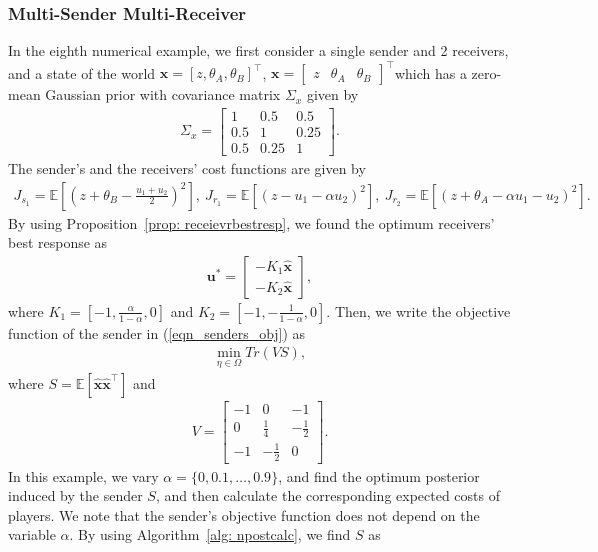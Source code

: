 \documentclass[12pt,journal,onecolumn]{IEEEtran}
\begin{document}
\subsubsection{Multi-Sender Multi-Receiver}
In the eighth numerical example, we first consider a single sender and 2 receivers, and a state of the world $\boldsymbol{x} = [z, \theta_A, \theta_B ]^\top$,  $\boldsymbol{x} = \begin{bmatrix}
    z & \theta_A &\theta_B 
\end{bmatrix}^\top$which has a zero-mean Gaussian prior with covariance matrix $\Sigma_x$ given by 
\begin{align}
    \Sigma_x=\begin{bmatrix}1 &0.5 &0.5\\0.5 &1 &0.25\\ 0.5 &0.25 &1\end{bmatrix}.
\end{align}
The sender's and the receivers' cost functions are given by 
\begin{align}
 J_{s_1} =\mathbb{E}\left[\left(z+ \theta_B-\frac{u_1+u_2}{2}\right)^2\right], ~
 J_{r_1} \!=\!\mathbb{E}\left[\left(z- u_1-\alpha u_2\right)^2\right],~
 J_{r_2} \!=\!\mathbb{E}\left[\left(z+\theta_A\!-\!\alpha u_1\!-\!u_2\right)^2\right].
\end{align}
By using Proposition~\ref{prop: receievrbestresp}, we found the optimum receivers' best response as
    \begin{align*}
        \boldsymbol{u}^*=\begin{bmatrix}
            -K_1\boldsymbol{\hat{x}} \\ -K_2\boldsymbol{\hat{x}}
        \end{bmatrix},
    \end{align*}
where $K_1 = [-1, \frac{\alpha}{1-\alpha}, 0]$ and $K_2 = [-1, -\frac{1}{1-\alpha}, 0]$. Then, we write the objective function of the sender in (\ref{eqn_senders_obj}) as
\begin{align}
    \min_{\eta\in\Omega} Tr(VS),
\end{align}
where $S=\mathbb{E}[\hat{\boldsymbol{x}}\hat{\boldsymbol{x}}^\top]$ and 
\begin{align}
   V=\begin{bmatrix} 
   -1 &0 &-1\\0 &\frac{1}{4} &-\frac{1}{2}\\ -1 &-\frac{1}{2} &0 
   \end{bmatrix}.
\end{align}
In this example, we vary $\alpha =\{0,0.1,\dots, 0.9\}$, and find the optimum posterior induced by the sender $S$, and then calculate the corresponding expected costs of players. We note that the sender's objective function does not depend on the variable $\alpha$. By using Algorithm~\ref{alg: npostcalc}, we find $S$ as 
\end{document}
